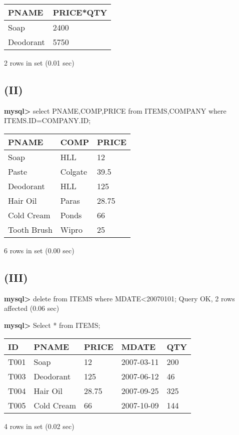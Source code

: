 \documentclass[11pt]{article}
\begin{document}
\begin{center}
\begin{tabular}{|l|l|}
\hline
PNAME & PRICE*QTY \\
\hline
Soap & 2400 \\
Deodorant & 5750 \\
\hline
\end{tabular}
\end{center}

2 rows in set (0.01 sec)

\subsection{(II)}
\label{sec:org64817aa}
\textbf{mysql>} select PNAME,COMP,PRICE from ITEMS,COMPANY where ITEMS.ID=COMPANY.ID;
\begin{center}
\begin{tabular}{|l|l|l|}
\hline
PNAME & COMP & PRICE \\
\hline
Soap & HLL & 12 \\
Paste & Colgate & 39.5 \\
Deodorant & HLL & 125 \\
Hair Oil & Paras & 28.75 \\
Cold Cream & Ponds & 66 \\
Tooth Brush & Wipro & 25 \\
\hline
\end{tabular}
\end{center}
6 rows in set (0.00 sec)

\subsection{(III)}
\label{sec:orga07b6bc}
\textbf{mysql>} delete from ITEMS where MDATE<20070101;
Query OK, 2 rows affected (0.06 sec)

\textbf{mysql>} Select * from ITEMS;
\begin{center}
\begin{tabular}{|l|l|l|l|l|}
\hline
ID & PNAME & PRICE & MDATE & QTY \\
\hline
T001 & Soap & 12 & 2007-03-11 & 200 \\
T003 & Deodorant & 125 & 2007-06-12 & 46 \\
T004 & Hair Oil & 28.75 & 2007-09-25 & 325 \\
T005 & Cold Cream & 66 & 2007-10-09 & 144 \\
\hline
\end{tabular}
\end{center}
4 rows in set (0.02 sec)
\end{document}

